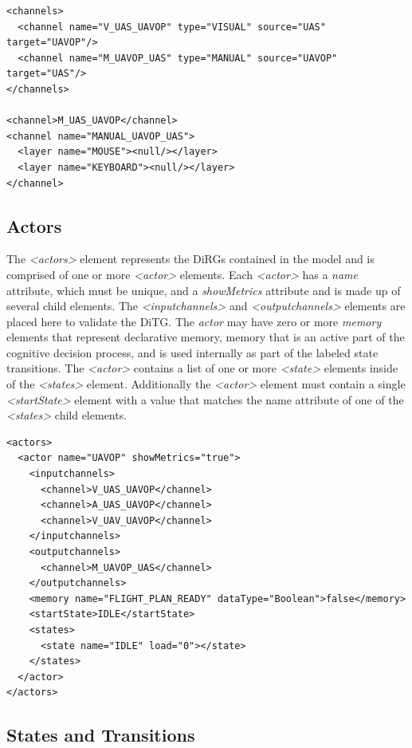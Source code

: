 \begin{lstlisting}[frame=single]
<channels>
  <channel name="V_UAS_UAVOP" type="VISUAL" source="UAS" target="UAVOP"/>
  <channel name="M_UAVOP_UAS" type="MANUAL" source="UAVOP" target="UAS"/>
</channels>

<channel>M_UAS_UAVOP</channel>
<channel name="MANUAL_UAVOP_UAS">
  <layer name="MOUSE"><null/></layer>
  <layer name="KEYBOARD"><null/></layer>
</channel>
\end{lstlisting}


\subsection{Actors}

The {\em \textless actors\textgreater} element represents the DiRGs contained in the model and is comprised of one or more {\em \textless actor\textgreater} elements.  Each {\em \textless actor\textgreater} has a {\em name} attribute, which must be unique, and a {\em showMetrics} attribute and is made up of several child elements.  The {\em \textless inputchannels\textgreater} and {\em \textless outputchannels\textgreater} elements are placed here to validate the DiTG.  The {\em actor} may have zero or more {\em memory} elements that represent declarative memory, memory that is an active part of the cognitive decision process, and is used internally as part of the labeled state transitions.  The {\em \textless actor\textgreater} contains a list of one or more {\em \textless state\textgreater} elements inside of the {\em \textless states\textgreater} element.  Additionally the {\em \textless actor\textgreater} element must contain a single {\em \textless startState\textgreater} element with a value that matches the name attribute of one of the {\em \textless states\textgreater} child elements.

\begin{lstlisting}[frame=single]
<actors>
  <actor name="UAVOP" showMetrics="true">
    <inputchannels>
      <channel>V_UAS_UAVOP</channel>
      <channel>A_UAS_UAVOP</channel>
      <channel>V_UAV_UAVOP</channel>
    </inputchannels>
    <outputchannels>
      <channel>M_UAVOP_UAS</channel>
    </outputchannels>
    <memory name="FLIGHT_PLAN_READY" dataType="Boolean">false</memory>
    <startState>IDLE</startState>
    <states>
      <state name="IDLE" load="0"></state>
    </states>
  </actor>
</actors>
\end{lstlisting}

\subsection{States and Transitions}

